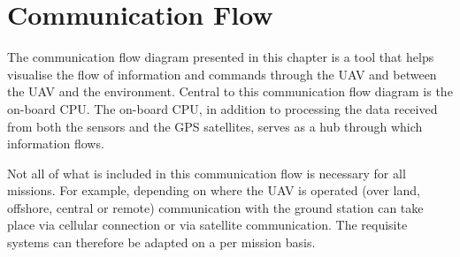 \section{Communication Flow}
\label{secCF}
The communication flow diagram presented in this chapter is a tool that helps visualise the flow of information and commands through the UAV and between the UAV and the environment. Central to this communication flow diagram is the on-board CPU. The on-board CPU, in addition to processing the data received from both the sensors and the GPS satellites, serves as a hub through which information flows.

Not all of what is included in this communication flow is necessary for all missions. For example, depending on where the UAV is operated (over land, offshore, central or remote) communication with the ground station can take place via cellular connection or via satellite communication. The requisite systems can therefore be adapted on a per mission basis.

